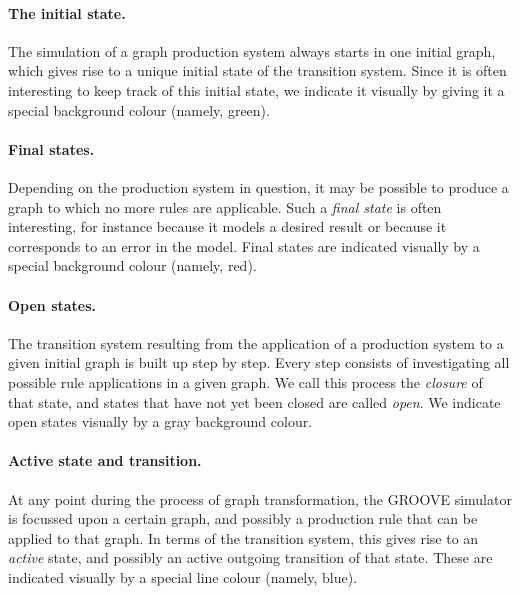 \paragraph{The initial state.}

The simulation of a graph production system always starts in one initial graph,
which gives rise to a unique initial state of the transition system. Since it
is often interesting to keep track of this initial state, we indicate it
visually by giving it a special background colour (namely, green).

\paragraph{Final states.}

Depending on the production system in question, it may be possible to produce a
graph to which no more rules are applicable. Such a \emph{final state} is often
interesting, for instance because it models a desired result or because it
corresponds to an error in the model. Final states are indicated visually by a
special background colour (namely, red).

\paragraph{Open states.}

The transition system resulting from the application of a production system to
a given initial graph is built up step by step. Every step consists of
investigating all possible rule applications in a given graph. We call this
process the \emph{closure} of that state, and states that have not yet been
closed are called \emph{open}. We indicate open states visually by a gray
background colour.

\paragraph{Active state and transition.}

At any point during the process of graph transformation, the GROOVE
simulator is focussed upon a certain graph, and possibly a production rule
that can be applied to that graph. In terms of the transition system, this
gives rise to an \emph{active} state, and possibly an active outgoing
transition of that state. These are indicated visually by a special line
colour (namely, blue).


